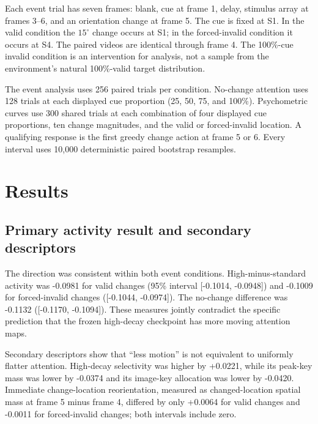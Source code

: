 \documentclass[11pt]{article}
\begin{document}
Each event trial has seven frames: blank, cue at frame 1, delay, stimulus array at frames 3--6, and an orientation change at frame 5. The cue is fixed at S1. In the valid condition the $15^\circ$ change occurs at S1; in the forced-invalid condition it occurs at S4. The paired videos are identical through frame 4. The 100\%-cue invalid condition is an intervention for analysis, not a sample from the environment's natural 100\%-valid target distribution.

The event analysis uses 256 paired trials per condition. No-change attention uses 128 trials at each displayed cue proportion (25, 50, 75, and 100\%). Psychometric curves use 300 shared trials at each combination of four displayed cue proportions, ten change magnitudes, and the valid or forced-invalid location. A qualifying response is the first greedy change action at frame 5 or 6. Every interval uses 10,000 deterministic paired bootstrap resamples.

\section{Results}
\subsection{Primary activity result and secondary descriptors}
The direction was consistent within both event conditions. High-minus-standard activity was -0.0981 for valid changes (95\% interval [-0.1014, -0.0948]) and -0.1009 for forced-invalid changes ([-0.1044, -0.0974]). The no-change difference was -0.1132 ([-0.1170, -0.1094]). These measures jointly contradict the specific prediction that the frozen high-decay checkpoint has more moving attention maps.

Secondary descriptors show that ``less motion'' is not equivalent to uniformly flatter attention. High-decay selectivity was higher by +0.0221, while its peak-key mass was lower by -0.0374 and its image-key allocation was lower by -0.0420. Immediate change-location reorientation, measured as changed-location spatial mass at frame 5 minus frame 4, differed by only +0.0064 for valid changes and -0.0011 for forced-invalid changes; both intervals include zero.
\end{document}
